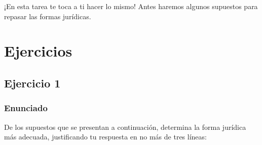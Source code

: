 ¡En esta tarea te toca a ti hacer lo mismo! Antes haremos algunos supuestos para repasar las formas jurídicas.

\section{Ejercicios}


\subsection{Ejercicio 1}

\subsubsection{Enunciado}
De los supuestos que se presentan a continuación, determina la forma jurídica más adecuada, justificando tu respuesta en no más de tres líneas:

